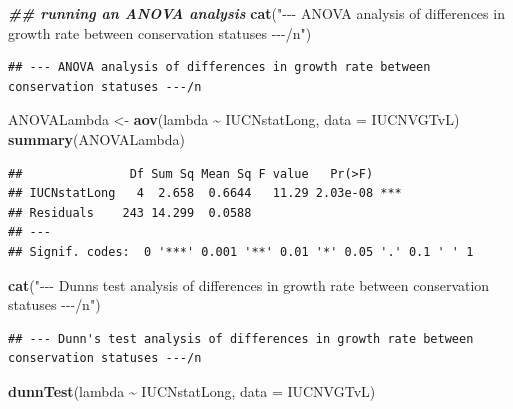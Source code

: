 \documentclass[
]{article}
\newenvironment{Shaded}{\begin{snugshade}}{\end{snugshade}}
\newcommand{\AttributeTok}[1]{\textcolor[rgb]{0.13,0.29,0.53}{#1}}
\newcommand{\DocumentationTok}[1]{\textcolor[rgb]{0.56,0.35,0.01}{\textbf{\textit{#1}}}}
\newcommand{\FunctionTok}[1]{\textcolor[rgb]{0.13,0.29,0.53}{\textbf{#1}}}
\newcommand{\NormalTok}[1]{#1}
\newcommand{\OtherTok}[1]{\textcolor[rgb]{0.56,0.35,0.01}{#1}}
\newcommand{\SpecialCharTok}[1]{\textcolor[rgb]{0.81,0.36,0.00}{\textbf{#1}}}
\newcommand{\StringTok}[1]{\textcolor[rgb]{0.31,0.60,0.02}{#1}}
\begin{document}
\begin{Shaded}
\begin{Highlighting}[]
\DocumentationTok{\#\# running an ANOVA analysis}
\FunctionTok{cat}\NormalTok{(}\StringTok{"{-}{-}{-} ANOVA analysis of differences in growth rate between conservation statuses {-}{-}{-}/n"}\NormalTok{)}
\end{Highlighting}
\end{Shaded}

\begin{verbatim}
## --- ANOVA analysis of differences in growth rate between conservation statuses ---/n
\end{verbatim}

\begin{Shaded}
\begin{Highlighting}[]
\NormalTok{ANOVALambda }\OtherTok{\textless{}{-}} \FunctionTok{aov}\NormalTok{(lambda }\SpecialCharTok{\textasciitilde{}}\NormalTok{ IUCNstatLong, }\AttributeTok{data =}\NormalTok{ IUCNVGTvL)}
\FunctionTok{summary}\NormalTok{(ANOVALambda)}
\end{Highlighting}
\end{Shaded}

\begin{verbatim}
##               Df Sum Sq Mean Sq F value   Pr(>F)    
## IUCNstatLong   4  2.658  0.6644   11.29 2.03e-08 ***
## Residuals    243 14.299  0.0588                     
## ---
## Signif. codes:  0 '***' 0.001 '**' 0.01 '*' 0.05 '.' 0.1 ' ' 1
\end{verbatim}

\begin{Shaded}
\begin{Highlighting}[]
\FunctionTok{cat}\NormalTok{(}\StringTok{"{-}{-}{-} Dunn\textquotesingle{}s test analysis of differences in growth rate between conservation statuses {-}{-}{-}/n"}\NormalTok{)}
\end{Highlighting}
\end{Shaded}

\begin{verbatim}
## --- Dunn's test analysis of differences in growth rate between conservation statuses ---/n
\end{verbatim}

\begin{Shaded}
\begin{Highlighting}[]
\FunctionTok{dunnTest}\NormalTok{(lambda }\SpecialCharTok{\textasciitilde{}}\NormalTok{ IUCNstatLong, }\AttributeTok{data =}\NormalTok{ IUCNVGTvL)}
\end{Highlighting}
\end{Shaded}
\end{document}
